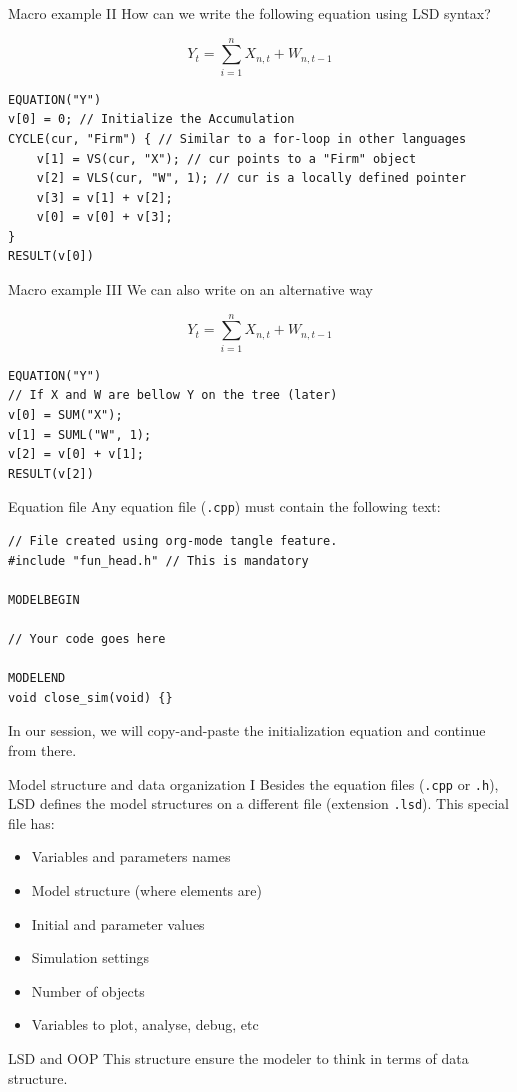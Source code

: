\documentclass[bigger,aspectratio=169]{beamer}
\begin{document}
\begin{frame}[label={sec:org00f409a},fragile]{Macro example II}
 How can we write the following equation using LSD syntax?

\[Y_{t} = \sum_{i=1}^{n} X_{n,t} + W_{n,t-1}\]



\begin{verbatim}
EQUATION("Y")
v[0] = 0; // Initialize the Accumulation
CYCLE(cur, "Firm") { // Similar to a for-loop in other languages
    v[1] = VS(cur, "X"); // cur points to a "Firm" object
    v[2] = VLS(cur, "W", 1); // cur is a locally defined pointer
    v[3] = v[1] + v[2];
    v[0] = v[0] + v[3];
}
RESULT(v[0])
\end{verbatim}
\end{frame}
\begin{frame}[label={sec:orgb55eba3},fragile]{Macro example III}
 We can also write on an alternative way

\[Y_{t} = \sum_{i=1}^{n} X_{n,t} + W_{n,t-1}\]



\begin{verbatim}
EQUATION("Y")
// If X and W are bellow Y on the tree (later)
v[0] = SUM("X");
v[1] = SUML("W", 1);
v[2] = v[0] + v[1];
RESULT(v[2])
\end{verbatim}
\end{frame}
\begin{frame}[label={sec:org20ff170},fragile]{Equation file}
 Any equation file (\texttt{.cpp}) must contain the following text:
\begin{verbatim}
// File created using org-mode tangle feature.
#include "fun_head.h" // This is mandatory

MODELBEGIN

// Your code goes here

MODELEND
void close_sim(void) {}
\end{verbatim}

In our session, we will copy-and-paste the initialization equation and continue from there.
\end{frame}
\begin{frame}[label={sec:orgd3fc34b},fragile]{Model structure and data organization I}
 Besides the equation files (\texttt{.cpp} or \texttt{.h}), LSD defines the model structures on a different file (extension \texttt{.lsd}).
This special file has:

\begin{itemize}
\item Variables and parameters names
\item Model structure (where elements are)
\item Initial and parameter values
\item Simulation settings
\item Number of objects
\item Variables to plot, analyse, debug, etc
\end{itemize}
\begin{block}{LSD and OOP}
This structure ensure the modeler to think in terms of data structure.
\end{block}
\end{frame}
\end{document}
